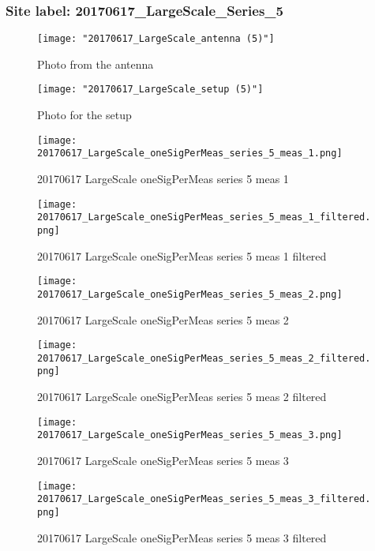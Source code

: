 \subsubsection{Site label: 20170617\_LargeScale\_Series\_5}
\begin{figure}[ht] \caption{Photo from the antenna}
\texttt{[image: "20170617\_LargeScale\_antenna (5)"]}\centering\end{figure}
\begin{figure}[ht] \caption{Photo for the setup}
\texttt{[image: "20170617\_LargeScale\_setup (5)"]}\centering\end{figure}
\begin{figure}[ht] \caption{20170617 LargeScale oneSigPerMeas series 5 meas 1}
\texttt{[image: 20170617\_LargeScale\_oneSigPerMeas\_series\_5\_meas\_1.png]}\centering\end{figure}
\begin{figure}[ht] \caption{20170617 LargeScale oneSigPerMeas series 5 meas 1 filtered}
\texttt{[image: 20170617\_LargeScale\_oneSigPerMeas\_series\_5\_meas\_1\_filtered.png]}\centering\end{figure}
\begin{figure}[ht] \caption{20170617 LargeScale oneSigPerMeas series 5 meas 2}
\texttt{[image: 20170617\_LargeScale\_oneSigPerMeas\_series\_5\_meas\_2.png]}\centering\end{figure}
\begin{figure}[ht] \caption{20170617 LargeScale oneSigPerMeas series 5 meas 2 filtered}
\texttt{[image: 20170617\_LargeScale\_oneSigPerMeas\_series\_5\_meas\_2\_filtered.png]}\centering\end{figure}
\begin{figure}[ht] \caption{20170617 LargeScale oneSigPerMeas series 5 meas 3}
\texttt{[image: 20170617\_LargeScale\_oneSigPerMeas\_series\_5\_meas\_3.png]}\centering\end{figure}
\begin{figure}[ht] \caption{20170617 LargeScale oneSigPerMeas series 5 meas 3 filtered}
\texttt{[image: 20170617\_LargeScale\_oneSigPerMeas\_series\_5\_meas\_3\_filtered.png]}\centering\end{figure}
\clearpage
